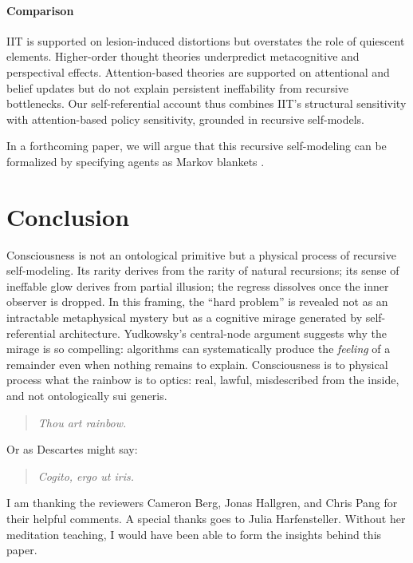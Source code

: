\documentclass[12pt]{article}
\begin{document}
\paragraph{Comparison}
IIT \parencite{oizumi2014_iit,tononi2014_phi} is supported on lesion-induced distortions but overstates the role of quiescent elements. 
Higher-order thought theories \parencite{rosenthal2005_consciousness} underpredict metacognitive and perspectival effects. 
Attention-based theories \parencite{prinz2012_attended} are supported on attentional and belief updates but do not explain persistent ineffability from recursive bottlenecks. 
Our self-referential account thus combines IIT's structural sensitivity with attention-based policy sensitivity, 
grounded in recursive self-models. 

In a forthcoming paper, we will argue that this recursive self-modeling can be formalized by specifying agents as Markov blankets \parencite{friston2010_free,parr2022_active}.

\section{Conclusion}

Consciousness is not an ontological primitive but a physical process of recursive self-modeling. 
Its rarity derives from the rarity of natural recursions; its sense of ineffable glow derives from partial illusion; 
the regress dissolves once the inner observer is dropped. 
In this framing, the ``hard problem'' is revealed not as an intractable metaphysical mystery but as a cognitive 
mirage generated by self-referential architecture. 
Yudkowsky's central-node argument suggests why the mirage is so compelling: 
algorithms can systematically produce the \emph{feeling} of a remainder even when nothing remains to explain. 
Consciousness is to physical process what the rainbow is to optics: 
real, lawful, misdescribed from the inside, and not ontologically sui generis.

\begin{quote}
\emph{Thou art rainbow.}
\end{quote}

Or as Descartes might say:

\begin{quote}
\emph{Cogito, ergo ut iris.}
\end{quote}

\noindent I am thanking the reviewers Cameron Berg, Jonas Hallgren, and Chris Pang for their helpful comments. 
A special thanks goes to Julia Harfensteller. Without her meditation teaching, I would have been able to form the insights behind this paper.

\printbibliography
\end{document}
